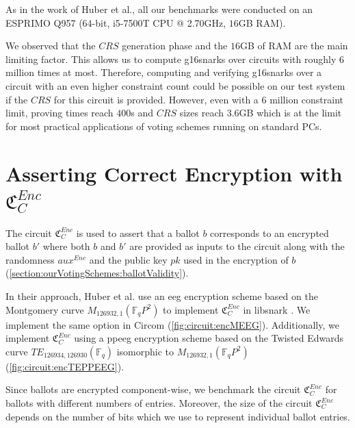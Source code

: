 As in the work of Huber et al., all our benchmarks were conducted on an ESPRIMO Q957 ($64$-bit, i5-7500T CPU @ 2.70GHz, $16$GB RAM).

We observed that the $CRS$ generation phase and the $16$GB of RAM are the main limiting factor.
This allows us to compute \glspl{g16snark} over circuits with roughly $6$ million times at most.
Therefore, computing and verifying \glspl{g16snark} over a circuit with an even higher constraint count could be possible on our test system if the $CRS$ for this circuit is provided.
However, even with a $6$ million constraint limit, proving times reach $400$s and $CRS$ sizes reach $3.6$GB which is at the limit for most practical applications of voting schemes running on standard PCs.

\section{Asserting Correct Encryption with $\mathfrak{C}_C^{Enc}$}
\label{section:results:assertEncryption}
The circuit $\mathfrak{C}_C^{Enc}$ is used to assert that a ballot $b$ corresponds to an encrypted ballot $b'$ where both $b$ and $b'$ are provided as inputs to the circuit along with the randomness $aux^{Enc}$ and the public key $pk$ used in the encryption of $b$ (\cref{section:ourVotingSchemes:ballotValidity}).

In their approach, Huber et al. use an \gls{eeg} encryption scheme based on the Montgomery curve $M_{126932, 1}(\mathbb{F}_qP^2)$ to implement $\mathfrak{C}_{C}^{Enc}$ in libsnark \cite{huber_zk-snarks_2025}.
We implement the same option in Circom (\cref{fig:circuit:encMEEG}).
Additionally, we implement $\mathfrak{C}_{C}^{Enc}$ using a \gls{ppeeg} encryption scheme based on the Twisted Edwards curve $TE_{126934, 126930}(\mathbb{F}_q)$ isomorphic to $M_{126932, 1}(\mathbb{F}_qP^2)$ (\cref{fig:circuit:encTEPPEEG}).

Since ballots are encrypted component-wise, we benchmark the circuit $\mathfrak{C}_C^{Enc}$ for ballots with different numbers of entries.
Moreover, the size of the circuit $\mathfrak{C}_C^{Enc}$ depends on the number of bits which we use to represent individual ballot entries.


